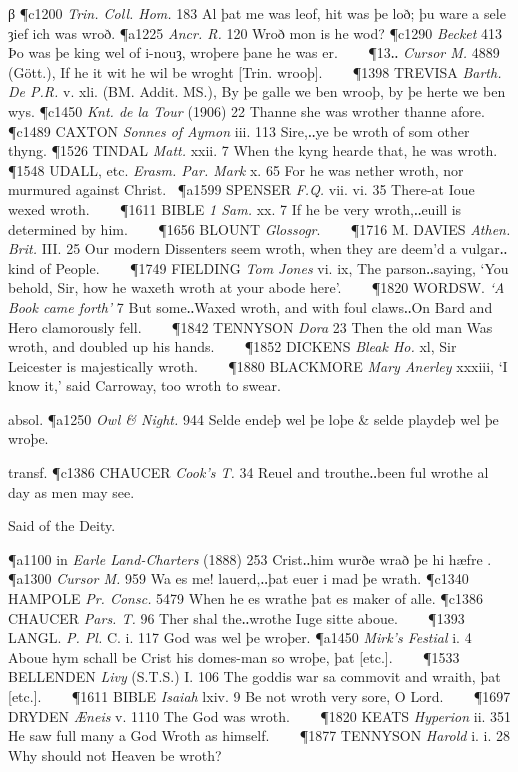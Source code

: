 \begin{description}[wide, labelwidth=!, labelindent=0pt]
\begin{myenumerate}
β \P c1200  \textit{Trin. Coll. Hom.} 183 Al þat me was leof, hit was þe loð; þu ware a sele ȝief ich was wroð.
\P a1225  \textit{Ancr. R.} 120 Wroð mon is he wod? 
\P c1290 \textit{Becket}  413 Þo was þe king wel of i-nouȝ, wroþere þane he was er.    
\P 13‥ \textit{Cursor M.} 4889 (Gött.), If he it wit he wil be wroght [Trin. wrooþ].    
\P 1398 TREVISA  \textit{Barth. De P.R.} v. xli. (BM. Addit. MS.), By þe galle we ben wrooþ, by þe herte we ben wys.
\P c1450  \textit{Knt. de la Tour} (1906) 22 Thanne she was wrother thanne afore.
\P c1489 CAXTON  \textit{Sonnes of Aymon} iii. 113 Sire,‥ye be wroth of som other thyng.
\P 1526 TINDAL  \textit{Matt.} xxii. 7 When the kyng hearde that, he was wroth. 
\P 1548 UDALL, etc. \textit{Erasm. Par. Mark} x. 65 For he was nether wroth, nor murmured against Christ. 
\P a1599 SPENSER  \textit{F.Q.} vii. vi. 35 There-at Ioue wexed wroth.    
\P 1611 BIBLE  \textit{1 Sam.} xx. 7 If he be very wroth,‥euill is determined by him.    
\P 1656 BLOUNT \textit{Glossogr}.    
\P 1716 M. DAVIES  \textit{Athen. Brit.} III. 25 Our modern Dissenters seem wroth, when they are deem'd a vulgar‥kind of People.    
\P 1749 FIELDING  \textit{Tom Jones} vi. ix, The parson‥saying, ‘You behold, Sir, how he waxeth wroth at your abode here’.    
\P 1820 WORDSW.  \textit{‘A Book came forth’} 7 But some‥Waxed wroth, and with foul claws‥On Bard and Hero clamorously fell.    
\P 1842 TENNYSON  \textit{Dora} 23 Then the old man Was wroth, and doubled up his hands.    
\P 1852 DICKENS  \textit{Bleak Ho.} xl, Sir Leicester is majestically wroth.    
\P 1880 BLACKMORE  \textit{Mary Anerley} xxxiii, ‘I know it,’ said Carroway, too wroth to swear.

\noindent absol. \P a1250 \textit{Owl \& Night.}  944 Selde endeþ wel þe loþe \& selde playdeþ wel þe wroþe.

\noindent transf. \P c1386 CHAUCER  \textit{Cook's T.} 34 Reuel and trouthe‥been ful wrothe al day as men may see.

 Said of the Deity.

\P a1100 in  \textit{Earle Land-Charters} (1888) 253 Crist‥him wurðe wrað þe hi hæfre .
\P a1300  \textit{Cursor M.} 959 Wa es me! lauerd,‥þat euer i mad þe wrath.
\P c1340 HAMPOLE  \textit{Pr. Consc.} 5479 When he es wrathe þat es maker of alle.
\P c1386 CHAUCER  \textit{Pars. T.} 96 Ther shal the‥wrothe Iuge sitte aboue.    
\P 1393 LANGL.  \textit{P. Pl.} C. i. 117 God was wel þe wroþer.
\P a1450 \textit{Mirk's  Festial} i. 4 Aboue hym schall be Crist his domes-man so wroþe, þat [etc.].    
\P 1533 BELLENDEN  \textit{Livy} (S.T.S.) I. 106 The goddis war sa commovit and wraith, þat [etc.].    
\P 1611 BIBLE  \textit{Isaiah} lxiv. 9 Be not wroth very sore, O Lord.    
\P 1697 DRYDEN \textit{Æneis} v. 1110 The  God was wroth.    
\P 1820 KEATS  \textit{Hyperion} ii. 351 He saw full many a God Wroth as himself.    
\P 1877 TENNYSON  \textit{Harold} i. i. 28 Why should not Heaven be wroth?


\end{myenumerate}
\end{description}
